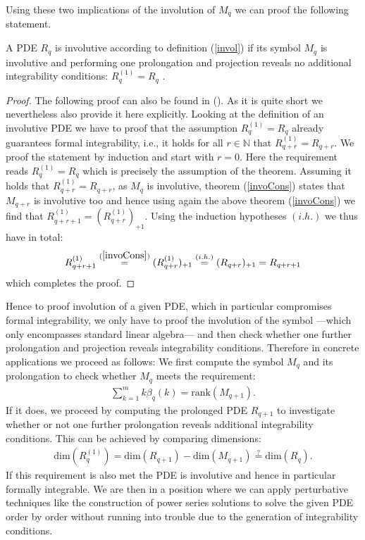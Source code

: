 Using these two implications of the involution of $M_q$ we can proof the following statement.
\begin{theorem}
A PDE $R_q$ is involutive according to definition (\ref{invol}) if its symbol $M_q$ is involutive and performing one prolongation and projection reveals no additional integrability conditions: $R_q^{(1)} = R_q$ .
\end{theorem}
\begin{proof}
The following proof can also be found in (\cite{seiler1994analysis}). As it is quite short we nevertheless also provide it here explicitly.
Looking at the definition of an involutive PDE we have to proof that the assumption $R_q^{(1)} = R_q$ already guarantees formal integrability, i.e., it holds for all $r \in \mathbb{N}$ that $R_{q+r}^{(1)} = R_{q+r}$. We proof the statement by induction and start with $r=0$. Here the requirement reads $R_q^{(1)}=R_q$ which is precisely the assumption of the theorem. Assuming it holds that $R_{q+r}^{(1)}=R_{q+r}$, as $M_q$ is involutive, theorem (\ref{invoCons}) states that $M_{q+r}$ is involutive too and hence using again the above theorem (\ref{invoCons}) we find that $R_{q+r+1}^{(1)}= (R_{q+r}^{(1)})_{+1}$. Using the induction hypotheses $(i.h.)$ we thus have in total:
\begin{align}
   R_{q+r+1}^{(1)} \overset{(\ref{invoCons})}{=} (R_{q+r}^{(1)})_{+1} \overset{(i.h.)}{=} (R_{q+r})_{+1} = R_{q+r+1} 
\end{align}
which completes the proof. 
\end{proof}
Hence to proof involution of a given PDE, which in  particular compromises formal integrability, we only have to proof the involution of the symbol ---which only encompasses standard linear algebra--- and then check whether one further prolongation and projection reveals integrability conditions. Therefore in concrete applications we proceed as follows: We first compute the symbol $M_q$ and its prolongation to check whether $M_q$ meets the requirement: 
\begin{align}
        \sum_{k=1}^m k\beta_q(k) = \mathrm{rank}(M_{q+1}).
\end{align}
If it does, we proceed by computing the prolonged PDE $R_{q+1}$ to investigate whether or not one further prolongation reveals additional integrability conditions. This can be achieved by comparing dimensions:
\begin{align}\label{dims}
    \mathrm{dim}(R_q^{(1)}) = \mathrm{dim}(R_{q+1}) - \mathrm{dim}(M_{q+1}) \stackrel{?}{=} \mathrm{dim}(R_q).
\end{align}
If this requirement is also met the PDE is involutive and hence in particular formally integrable. We are then in a position where we can apply perturbative techniques like the construction of power series solutions to solve the given PDE order by order without running into trouble due to the generation of integrability conditions.


